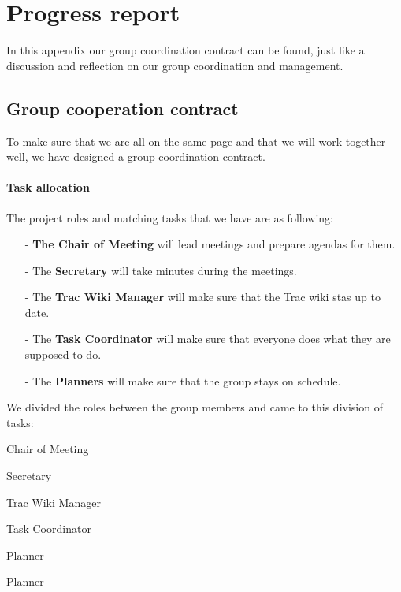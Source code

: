 \chapter{Progress report}

In this appendix our group coordination contract can be found, just like a discussion and reflection on our group coordination and management.

\section{Group cooperation contract}

To make sure that we are all on the same page and that we will work together well, we have designed a group coordination contract.
\subsubsection{Task allocation}
The project roles and matching tasks that we have are as following:
\begin{itemize}
\item[-] \textbf{The Chair of Meeting} will lead meetings and prepare agendas for them.
\item[-] The \textbf{Secretary} will take minutes during the meetings.
\item[-] The \textbf{Trac Wiki Manager} will make sure that the Trac wiki stas up to date.
\item[-] The \textbf{Task Coordinator} will make sure that everyone does what they are supposed to do.
\item[-] The \textbf{Planners} will make sure that the group stays on schedule.
\end{itemize}

We divided the roles between the group members and came to this division of tasks:

\begin{description}[noitemsep]
\item[Lisette] Chair of Meeting
\item[Ashay] Secretary
\item[Joshua] Trac Wiki Manager
\item[Jelle] Task Coordinator
\item[Gavin] Planner
\item[Youp] Planner
\end{description}

